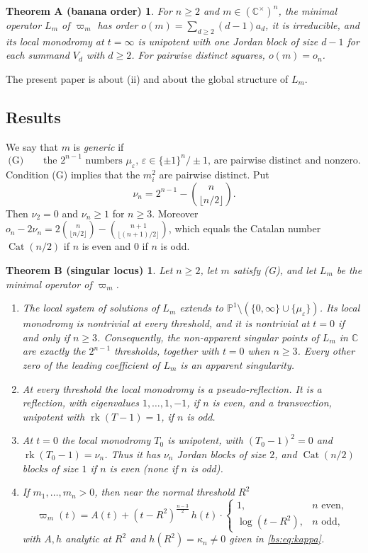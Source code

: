 \documentclass[11pt,a4paper]{article}
\newtheorem*{theoremA}{Theorem A (banana order)}
\newtheorem*{theoremB}{Theorem B (singular locus)}
\theoremstyle{definition}
\theoremstyle{remark}
\numberwithin{equation}{section}
\newcommand{\C}{\mathbb{C}}
\DeclareMathOperator{\rk}{rk}
\newcommand{\PP}{\mathbb{P}}
\DeclareMathOperator{\Cat}{Cat}
\begin{document}
\begin{theoremA}
For $n\ge2$ and $m\in(\C^\times)^n$, the minimal operator $L_m$ of $\varpi_m$ has order $o(m)=\sum_{d\ge2}(d-1)a_d$, it is irreducible, and its local monodromy at $t=\infty$ is unipotent with one Jordan block of size $d-1$ for each summand $V_d$ with $d\ge2$. For pairwise distinct squares, $o(m)=o_n$.
\end{theoremA}

The present paper is about (ii) and about the global structure of $L_m$.

\subsection{Results}
We say that $m$ is \emph{generic} if
\[
\text{(G)}\qquad\text{the $2^{n-1}$ numbers $\mu_\varepsilon$, $\varepsilon\in\{\pm1\}^n/\pm1$, are pairwise distinct and nonzero.}
\]
Condition (G) implies that the $m_i^2$ are pairwise distinct. Put
\[
\nu_n=2^{n-1}-\binom{n}{\lfloor n/2\rfloor}.
\]
Then $\nu_2=0$ and $\nu_n\ge1$ for $n\ge3$. Moreover $o_n-2\nu_n=2\binom{n}{\lfloor n/2\rfloor}-\binom{n+1}{\lfloor (n+1)/2\rfloor}$, which equals the Catalan number $\Cat(n/2)$ if $n$ is even and $0$ if $n$ is odd.

\begin{theoremB}
Let $n\ge2$, let $m$ satisfy {\rm(G)}, and let $L_m$ be the minimal operator of $\varpi_m$.
\begin{enumerate}
\item[(i)] The local system of solutions of $L_m$ extends to $\PP^1\setminus(\{0,\infty\}\cup\{\mu_\varepsilon\})$. Its local monodromy is nontrivial at every threshold, and it is nontrivial at $t=0$ if and only if $n\ge3$. Consequently, the non-apparent singular points of $L_m$ in $\C$ are exactly the $2^{n-1}$ thresholds, together with $t=0$ when $n\ge3$. Every other zero of the leading coefficient of $L_m$ is an apparent singularity.
\item[(ii)] At every threshold the local monodromy is a pseudo-reflection. It is a reflection, with eigenvalues $1,\dots,1,-1$, if $n$ is even, and a transvection, unipotent with $\rk(T-1)=1$, if $n$ is odd.
\item[(iii)] At $t=0$ the local monodromy $T_0$ is unipotent, with $(T_0-1)^2=0$ and $\rk(T_0-1)=\nu_n$. Thus it has $\nu_n$ Jordan blocks of size $2$, and $\Cat(n/2)$ blocks of size $1$ if $n$ is even (none if $n$ is odd).
\item[(iv)] If $m_1,\dots,m_n>0$, then near the normal threshold $R^2$
\[
\varpi_m(t)=A(t)+(t-R^2)^{\frac{n-3}2}\,h(t)\cdot\begin{cases}1,& n\text{ even},\\ \log(t-R^2),& n\text{ odd},\end{cases}
\]
with $A,h$ analytic at $R^2$ and $h(R^2)=\kappa_n\ne0$ given in \eqref{bs:eq:kappa}.
\end{enumerate}
\end{theoremB}
\end{document}
